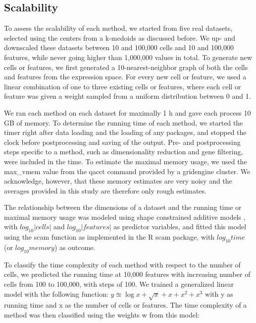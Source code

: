\subsection{Scalability}

To assess the scalability of each method, we started from five real datasets, selected using the centers from a k-medoids as discussed before. We up- and downscaled these datasets between 10 and 100,000 cells and 10 and 100,000 features, while never going higher than 1,000,000 values in total. To generate new cells or features, we first generated a 10-nearest-neighbor graph of both the cells and features from the expression space. For every new cell or feature, we used a linear combination of one to three existing cells or features, where each cell or feature was given a weight sampled from a uniform distribution between 0 and 1.

We ran each method on each dataset for maximally 1 h and gave each process 10 GB of memory. To determine the running time of each method, we started the timer right after data loading and the loading of any packages, and stopped the clock before postprocessing and saving of the output. Pre- and postprocessing steps specific to a method, such as dimensionality reduction and gene filtering, were included in the time. To estimate the maximal memory usage, we used the max\_vmem value from the qacct command provided by a gridengine cluster. We acknowledge, however, that these memory estimates are very noisy and the averages provided in this study are therefore only rough estimates.

The relationship between the dimensions of a dataset and the running time or maximal memory usage was modeled using shape constrained additive models \cite{pya_shapeconstrainedadditive_2015}, with $log_{10}|\textit{cells}|$ and $log_{10}|\textit{features}|$ as predictor variables, and fitted this model using the scam function as implemented in the R scam package, with $log_{10}\textit{time}$ (or $log_{10}\textit{memory}$) as outcome.

To classify the time complexity of each method with respect to the number of cells, we predicted the running time at 10,000 features with increasing number of cells from 100 to 100,000, with steps of 100. We trained a generalized linear model with the following function: $y \approxeq \log{x} + \sqrt{x} + x + x^2 + x^3$ with y as running time and x as the number of cells or features. The time complexity of a method was then classified using the weights w from this model:

